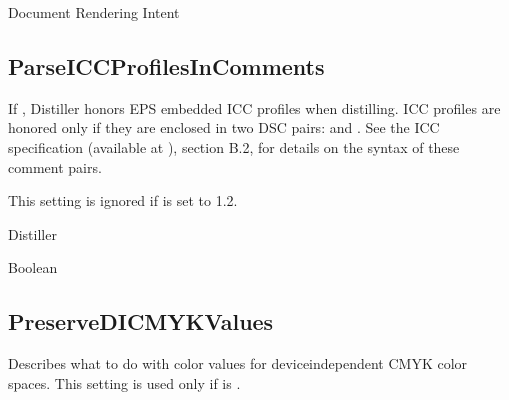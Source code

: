 \documentclass[letterpaper,12pt,english,openany,oneside]{sphinxmanual}
\begin{document}
Document Rendering Intent

\label{\detokenize{PDF_Create_CommonSettings:default-value-73}}

\begin{sphinxVerbatim}[commandchars=\\\{\}]
\end{sphinxVerbatim}




\subsection{ParseICCProfilesInComments}
\label{\detokenize{PDF_Create_CommonSettings:parseiccprofilesincomments}}
If  , Distiller honors EPS embedded ICC profiles when distilling. ICC profiles are honored only if they are enclosed in two DSC pairs:  and  . See the ICC specification (available at  ), section B.2, for details on the syntax of these comment pairs.

This setting is ignored if  is set to 1.2.

\label{\detokenize{PDF_Create_CommonSettings:supported-by-80}}

Distiller

\label{\detokenize{PDF_Create_CommonSettings:type-79}}

Boolean

\label{\detokenize{PDF_Create_CommonSettings:ui-name-66}}


\label{\detokenize{PDF_Create_CommonSettings:default-value-74}}

\begin{sphinxVerbatim}[commandchars=\\\{\}]
\end{sphinxVerbatim}




\subsection{PreserveDICMYKValues}
\label{\detokenize{PDF_Create_CommonSettings:preservedicmykvalues}}
Describes what to do with color values for device\sphinxhyphen{}independent CMYK color spaces. This setting is used only if  is  .
\end{document}
